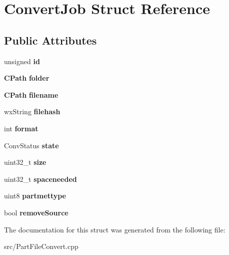 \section{ConvertJob Struct Reference}
\label{structConvertJob}
\subsection*{Public Attributes}
\begin{DoxyCompactItemize}
\item 
unsigned {\bfseries id}\label{structConvertJob_ad577f12fefdd5321497dc38876de96da}

\item 
{\bf CPath} {\bfseries folder}\label{structConvertJob_a2528c00d8d6e417b3111eb3ca575dffb}

\item 
{\bf CPath} {\bfseries filename}\label{structConvertJob_a3b0cfebc8e0b6484da38329366dc066c}

\item 
wxString {\bfseries filehash}\label{structConvertJob_a00f05cfe4e91e6f15661a465e7263c37}

\item 
int {\bfseries format}\label{structConvertJob_a1daa9111e4057c16de0045913312a6a0}

\item 
ConvStatus {\bfseries state}\label{structConvertJob_a248273eab9a113d27a71c3e1e1790beb}

\item 
uint32\_\-t {\bfseries size}\label{structConvertJob_a79c00e43682f2e334b87c9052cee040b}

\item 
uint32\_\-t {\bfseries spaceneeded}\label{structConvertJob_aa5bd96676ddfb8da9266802c611922fc}

\item 
uint8 {\bfseries partmettype}\label{structConvertJob_ab5853a7ace7528100e1e751bd804da24}

\item 
bool {\bfseries removeSource}\label{structConvertJob_a61f9445dd21c4536e46c9da853f2c0fd}

\end{DoxyCompactItemize}


The documentation for this struct was generated from the following file:\begin{DoxyCompactItemize}
\item 
src/PartFileConvert.cpp\end{DoxyCompactItemize}
